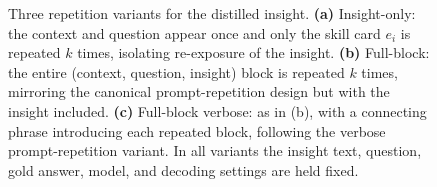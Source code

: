 \begin{figure}[t]
{\begin{tikzpicture}
\end{tikzpicture}}
\caption{Three repetition variants for the distilled insight. \textbf{(a)}
Insight-only: the context and question appear once and only the skill card $e_i$
is repeated $k$ times, isolating re-exposure of the insight. \textbf{(b)}
Full-block: the entire (context, question, insight) block is repeated $k$ times,
mirroring the canonical prompt-repetition design but with the insight included.
\textbf{(c)} Full-block verbose: as in (b), with a connecting phrase introducing
each repeated block, following the verbose prompt-repetition variant. In all
variants the insight text, question, gold answer, model, and decoding settings are
held fixed.}
\label{fig:variants}
\end{figure}